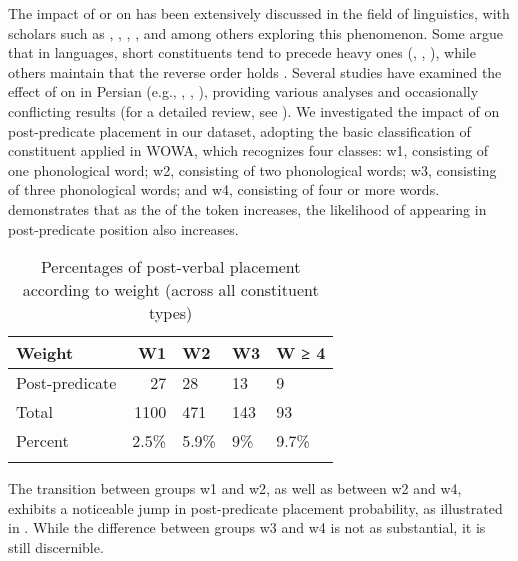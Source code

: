 \documentclass[output=paper,colorlinks,citecolor=brown,draftmode]{langscibook}
\begin{document}
The impact of  or  on  has been extensively discussed in the field of linguistics, with scholars such as \citet{behaghel_beziehungen_1909}, \citet{quirk_grammar_1972}, \citet{Hawkins1994performance}, \citet{Wasow1997weight}, and \citet{ArnoldLosongco2000} among others exploring this phenomenon. Some argue that in  languages, short constituents tend to precede heavy ones (\citealt{Wasow1997weight}, \citealt{Stallingsetal1998Phrasal}, \citealt{Hawkins1990universals,Hawkins1994performance}), while others maintain that the reverse order holds \citep{YamashitaChang2001headfinal}. Several studies have examined the effect of  on  in Persian (e.g., \citealt{RasekhMahand2016Relative}, \citealt{FaghiriSamvelian2014Order,FaghiriSamvelian2020SOV}, \citealt{FaghiriSamvelian2014Accesibility,Faghirietal2018Canonical}), providing various analyses and occasionally conflicting results (for a detailed review, see ). We investigated the impact of  on post-predicate placement in our dataset, adopting the basic classification of constituent  applied in WOWA, which recognizes four classes: w1, consisting of one phonological word; w2, consisting of two phonological words; w3, consisting of three phonological words; and w4, consisting of four or more words.  demonstrates that as the  of the token increases, the likelihood of appearing in post-predicate position also increases.

\begin{table}
 \begin{tabularx}{.8\textwidth}{lrYYY}
\lsptoprule
Weight & W1 & W2 & W3 & W ≥ 4 \\
\midrule
Post-predicate & 27 & 28 & 13 & 9 \\
Total & 1100 & 471 & 143 & 93 \\
Percent & 2.5\% & 5.9\% & 9\% & 9.7\% \\
\lspbottomrule
 \end{tabularx}
 \caption{Percentages of post-verbal placement according to weight (across all constituent types)}
 \label{ENP:tab:5}
\end{table}

The transition between groups w1 and w2, as well as between w2 and w4, exhibits a noticeable jump in post-predicate placement probability, as illustrated in . While the difference between groups w3 and w4 is not as substantial, it is still discernible.
\end{document}
